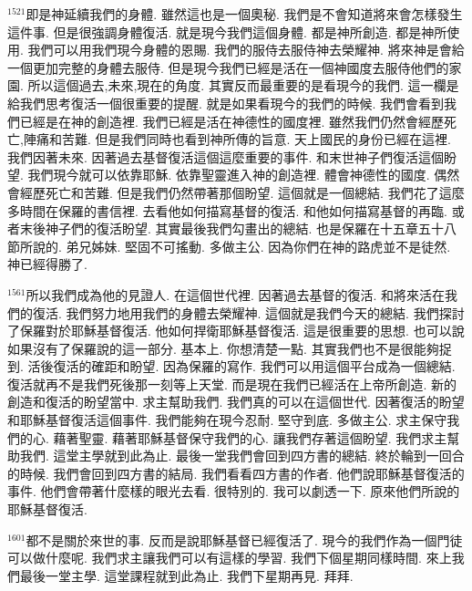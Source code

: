 \documentclass{book}
\begin{document}
$^{1521}$即是神延續我們的身體.
雖然這也是一個奧秘.
我們是不會知道將來會怎樣發生這件事.
但是很強調身體復活.
就是現今我們這個身體.
都是神所創造.
都是神所使用.
我們可以用我們現今身體的恩賜.
我們的服侍去服侍神去榮耀神.
將來神是會給一個更加完整的身體去服侍.
但是現今我們已經是活在一個神國度去服侍他們的家園.
所以這個過去,未來,現在的角度.
其實反而最重要的是看現今的我們.
這一欄是給我們思考復活一個很重要的提醒.
就是如果看現今的我們的時候.
我們會看到我們已經是在神的創造裡.
我們已經是活在神德性的國度裡.
雖然我們仍然會經歷死亡,陣痛和苦難.
但是我們同時也看到神所傳的旨意.
天上國民的身份已經在這裡.
我們因著未來.
因著過去基督復活這個這麼重要的事件.
和末世神子們復活這個盼望.
我們現今就可以依靠耶穌.
依靠聖靈進入神的創造裡.
體會神德性的國度.
偶然會經歷死亡和苦難.
但是我們仍然帶著那個盼望.
這個就是一個總結.
我們花了這麼多時間在保羅的書信裡.
去看他如何描寫基督的復活.
和他如何描寫基督的再臨.
或者末後神子們的復活盼望.
其實最後我們勾畫出的總結.
也是保羅在十五章五十八節所說的.
弟兄姊妹.
堅固不可搖動.
多做主公.
因為你們在神的路虎並不是徒然.
神已經得勝了.

$^{1561}$所以我們成為他的見證人.
在這個世代裡.
因著過去基督的復活.
和將來活在我們的復活.
我們努力地用我們的身體去榮耀神.
這個就是我們今天的總結.
我們探討了保羅對於耶穌基督復活.
他如何捍衛耶穌基督復活.
這是很重要的思想.
也可以說如果沒有了保羅說的這一部分.
基本上.
你想清楚一點.
其實我們也不是很能夠捉到.
活後復活的確距和盼望.
因為保羅的寫作.
我們可以用這個平台成為一個總結.
復活就再不是我們死後那一刻等上天堂.
而是現在我們已經活在上帝所創造.
新的創造和復活的盼望當中.
求主幫助我們.
我們真的可以在這個世代.
因著復活的盼望和耶穌基督復活這個事件.
我們能夠在現今忍耐.
堅守到底.
多做主公.
求主保守我們的心.
藉著聖靈.
藉著耶穌基督保守我們的心.
讓我們存著這個盼望.
我們求主幫助我們.
這堂主學就到此為止.
最後一堂我們會回到四方書的總結.
終於輪到一回合的時候.
我們會回到四方書的結局.
我們看看四方書的作者.
他們說耶穌基督復活的事件.
他們會帶著什麼樣的眼光去看.
很特別的.
我可以劇透一下.
原來他們所說的耶穌基督復活.

$^{1601}$都不是關於來世的事.
反而是說耶穌基督已經復活了.
現今的我們作為一個門徒可以做什麼呢.
我們求主讓我們可以有這樣的學習.
我們下個星期同樣時間.
來上我們最後一堂主學.
這堂課程就到此為止.
我們下星期再見.
拜拜.
\newpage
\end{document}
